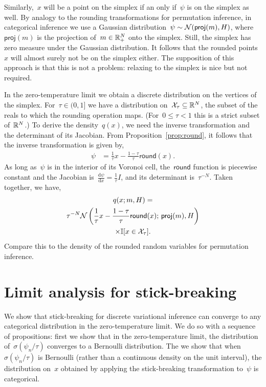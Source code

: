 \documentclass[twoside]{article}
\begin{document}
Similarly,~$x$ will be a point on the simplex if an only if~$\psi$ is
on the simplex as well.  By analogy to the rounding transformations
for permutation inference, in categorical inference we use a Gaussian
distribution~${\psi \sim \mathcal{N}(\mathsf{proj}(m), H)}$,
where~$\mathsf{proj}(m)$ is the projection of~$m \in \mathbb{R}_+^N$ onto
the simplex.  Still, the simplex has zero measure under the Gaussian
distribution.  It follows that the rounded points~$x$ will almost
surely not be on the simplex either.  The supposition of this approach
is that this is not a problem: relaxing to the simplex is nice but not
required.

In the zero-temperature limit we obtain a discrete distribution on the
vertices of the simplex.  For~${\tau \in (0,1]}$ we have a
distribution on~${\mathcal{X}_\tau \subseteq \mathbb{R}^N}$, the subset of the
reals to which the rounding operation maps. (For~${0 \leq \tau < 1}$
this is a strict subset of~$\mathbb{R}^N$.) To derive the
density~$q(x)$, we need the inverse transformation and the
determinant of its Jacobian.  From Proposition~\ref{prop:round}, it
follows that the inverse transformation is given by,
\begin{align*}
  \psi &= \frac{1}{\tau} x - \frac{1 - \tau}{\tau} \mathsf{round}(x).
\end{align*}
As long as~$\psi$ is in the interior of its Voronoi cell,
the~$\mathsf{round}$ function is piecewise constant and the
Jacobian is~${\tfrac{\mathrm{d}\psi}{\mathrm{d}x} = \tfrac{1}{\tau} I}$,
and its determinant is~$\tau^{-N}$. Taken together, we have,
\begin{multline*}
  q(x; m, H) =  \\
  \tau^{-N} \mathcal{N} \left(\frac{1}{\tau}x - \frac{1-\tau}{\tau} \mathsf{round}(x); \, \mathsf{proj}(m), H \right) \\
  \times \mathbb{I}[x \in \mathcal{X}_\tau].
\end{multline*}
Compare this to the density of the rounded random variables for
permutation inference. 

\section{Limit analysis for stick-breaking}

We show that stick-breaking for discrete variational inference can
converge to any categorical distribution in the zero-temperature
limit.  We do so with a sequence of propositions: first we show that
in the zero-temperature limit, the distribution
of~${\sigma(\psi_n / \tau)}$ converges to a Bernoulli distribution.
The we show that when~$\sigma(\psi_n / \tau)$ is Bernoulli (rather
than a continuous density on the unit interval), the distribution
on~$x$ obtained by applying the stick-breaking transformation
to~$\psi$ is categorical.
\end{document}
